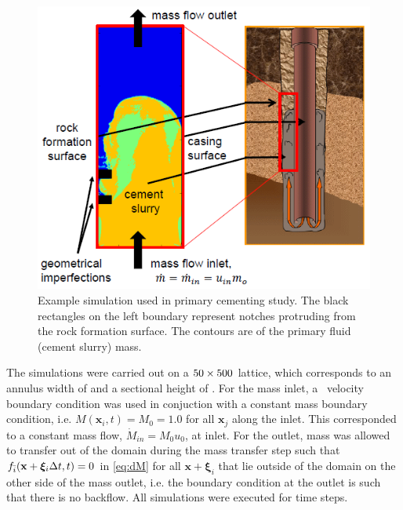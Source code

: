 \documentclass[pdftex,ms]{pittetd}
\newcommand{\pos}{\mathbf{x}}
\newcommand{\pvel}{\boldsymbol{\xi}}
\begin{document}
\begin{figure}
\centering
\includegraphics{figs/wellbore-cementing-schematic}
\caption{Example simulation used in primary cementing study.
The black rectangles on the left boundary represent notches protruding from the rock formation surface. The contours are of the primary fluid (cement slurry) mass.}
\label{fig:wellbore-cementing-schematic}
\end{figure}

The simulations were carried out on a $50 \times 500$ lattice, which corresponds to an annulus width of \anw \hspace{0.05cm} and a sectional height of \anh.
For the mass inlet, a~\citet{zou1997pressure} velocity boundary condition was used in conjuction with a constant mass boundary condition, i.e. $M(\pos_i, t) = M_0 = 1.0$ for all $\pos_j$ along the inlet.
This corresponded to a constant mass flow, $\dot{M}_{in} = M_0 u_0$, at inlet.
For the outlet, mass was allowed to transfer out of the domain during the mass transfer step such that $f_\opidx(\pos + \pvel_i \Delta t, t) = 0$ in \eqref{eq:dM} for all $\pos + \pvel_i$ that lie outside of the domain on the other side of the mass outlet, i.e. the boundary condition at the outlet is such that there is no backflow.
All simulations were executed for \nsteps time steps.
\end{document}
